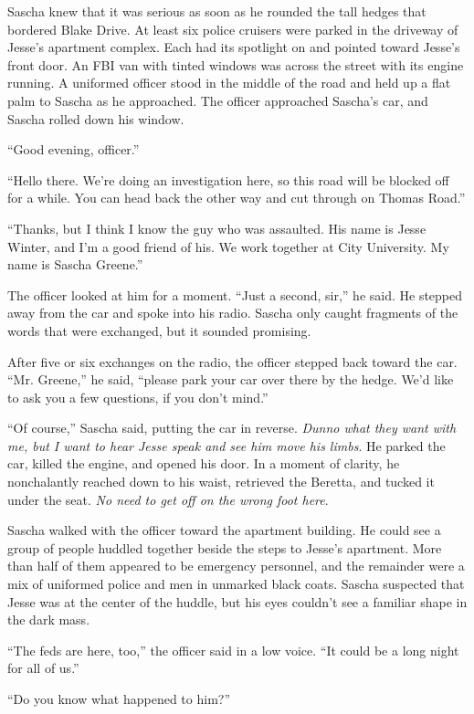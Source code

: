 \documentclass[12pt]{book}
\begin{document}
Sascha knew that it was serious as soon as he rounded the tall hedges that bordered Blake Drive.  At least six police cruisers were parked in the driveway of Jesse's apartment complex.  Each had its spotlight on and pointed toward Jesse's front door.  An FBI van with tinted windows was across the street with its engine running.  A uniformed officer stood in the middle of the road and held up a flat palm to Sascha as he approached.  The officer approached Sascha's car, and Sascha rolled down his window.

``Good evening, officer.''

``Hello there.  We're doing an investigation here, so this road will be blocked off for a while.  You can head back the other way and cut through on Thomas Road.''

``Thanks, but I think I know the guy who was assaulted.  His name is Jesse Winter, and I'm a good friend of his.  We work together at City University.  My name is Sascha Greene.''

The officer looked at him for a moment.  ``Just a second, sir,'' he said.  He stepped away from the car and spoke into his radio.  Sascha only caught fragments of the words that were exchanged, but it sounded promising.

After five or six exchanges on the radio, the officer stepped back toward the car.  ``Mr. Greene,'' he said, ``please park your car over there by the hedge.  We'd like to ask you a few questions, if you don't mind.''

``Of course,'' Sascha said, putting the car in reverse.  \emph{Dunno what they want with me, but I want to hear Jesse speak and see him move his limbs}.  He parked the car, killed the engine, and opened his door.  In a moment of clarity, he nonchalantly reached down to his waist, retrieved the Beretta, and tucked it under the seat.  \emph{No need to get off on the wrong foot here}.

Sascha walked with the officer toward the apartment building.  He could see a group of people huddled together beside the steps to Jesse's apartment.  More than half of them appeared to be emergency personnel, and the remainder were a mix of uniformed police and men in unmarked black coats.  Sascha suspected that Jesse was at the center of the huddle, but his eyes couldn't see a familiar shape in the dark mass.

``The feds are here, too,'' the officer said in a low voice.  ``It could be a long night for all of us.''

``Do you know what happened to him?''
\end{document}
